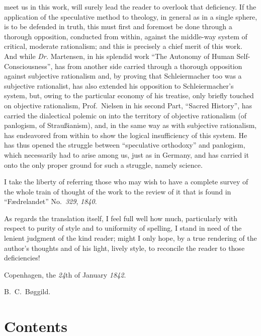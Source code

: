 \documentclass[12pt]{book}
\begin{document}
\noindent meet us in this work, will surely lead the reader to overlook that
deficiency. If the application of the speculative method to theology, in
general as in a single sphere, is to be defended in truth, this must first
and foremost be done through a thorough opposition, conducted from within,
against the middle-way system of critical, moderate rationalism; and this is
precisely a chief merit of this work. And while \textit{Dr.} Martensen, in his
splendid work ``The Autonomy of Human Self-Consciousness'', has from another
side carried through a thorough opposition against subjective rationalism
and, by proving that Schleiermacher too was a subjective rationalist, has also
extended his opposition to Schleiermacher's system, but, owing to the
particular economy of his treatise, only briefly touched on objective
rationalism, Prof.\ Nielsen in his second Part, ``Sacred History'', has
carried the dialectical polemic on into the territory of objective
rationalism (of panlogism, of Straußianism), and, in the same way as with
subjective rationalism, has endeavored from within to show the logical
insufficiency of this system. He has thus opened the struggle between
``speculative orthodoxy'' and panlogism, which necessarily had to arise among
us, just as in Germany, and has carried it onto the only proper ground for
such a struggle, namely science.

I take the liberty of referring those who may wish to have a complete survey
of the whole train of thought of the work to the review of it that is found in
``Fædrelandet'' No.\ \textit{329}, \textit{1840}.

As regards the translation itself, I feel full well how much, particularly with
respect to purity of style and to uniformity of spelling, I stand in need of
the lenient judgment of the kind reader; might I only hope, by a true rendering
of the author's thoughts and of his light, lively style, to reconcile the
reader to those deficiencies!

\bigskip
\begin{center}
Copenhagen, the \textit{24}th of January \textit{1842}.
\end{center}

\nopagebreak
\begin{flushright}
{\large B.\ C.\ Bøggild.}\hspace*{3em}
\end{flushright}

\chapter*{Contents}
{}
\end{document}
